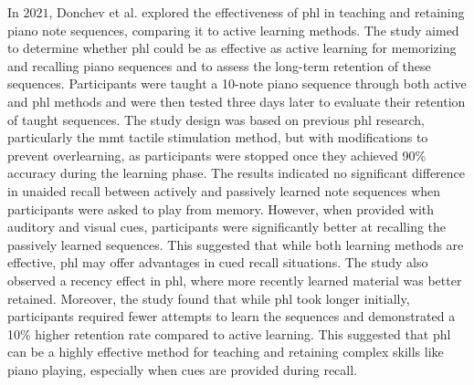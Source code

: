 In $2021$, Donchev et al. \cite{Donchev2021} explored the effectiveness of \gls{phl} in teaching and retaining piano note sequences, comparing it to active learning methods. The study aimed to determine whether \gls{phl} could be as effective as active learning for memorizing and recalling piano sequences and to assess the long-term retention of these sequences.
Participants were taught a 10-note piano sequence through both active and \gls{phl} methods and were then tested three days later to evaluate their retention of taught sequences. The study design was based on previous \gls{phl} research, particularly the \gls{mmt} tactile stimulation method, but with modifications to prevent overlearning, as participants were stopped once they achieved 90\% accuracy during the learning phase.
The results indicated no significant difference in unaided recall between actively and passively learned note sequences when participants were asked to play from memory. However, when provided with auditory and visual cues, participants were significantly better at recalling the passively learned sequences. This suggested that while both learning methods are effective, \gls{phl} may offer advantages in cued recall situations. The study also observed a recency effect in \gls{phl}, where more recently learned material was better retained.
Moreover, the study found that while \gls{phl} took longer initially, participants required fewer attempts to learn the sequences and demonstrated a 10\% higher retention rate compared to active learning. This suggested that \gls{phl} can be a highly effective method for teaching and retaining complex skills like piano playing, especially when cues are provided during recall.

